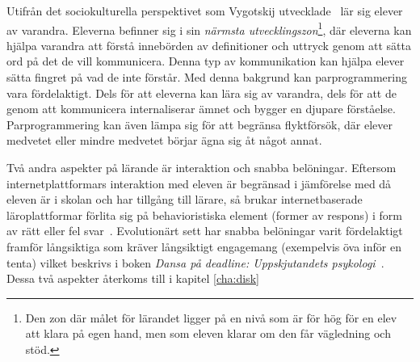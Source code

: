 Utifrån det sociokulturella perspektivet som Vygotskij utvecklade~\cite{LSB_und}
lär sig elever av varandra. Eleverna befinner sig i sin \textit{närmsta
utvecklingszon}\footnote{Den zon där målet för lärandet ligger på en nivå som är
för hög för en elev att klara på egen hand, men som eleven klarar om den får
vägledning och stöd.}, där eleverna kan hjälpa varandra att förstå innebörden av
definitioner och uttryck genom att sätta ord på det de vill kommunicera. Denna
typ av kommunikation kan hjälpa elever sätta fingret på vad de
inte förstår. Med denna bakgrund kan parprogrammering vara
fördelaktigt. Dels för att eleverna kan lära sig av varandra, dels för att de genom att
kommunicera
internaliserar ämnet och bygger en djupare
förståelse. Parprogrammering kan även lämpa sig för att begränsa
flyktförsök, där elever medvetet eller mindre medvetet börjar ägna sig åt något annat.


Två andra aspekter på lärande är interaktion och snabba
belöningar. Eftersom internetplattformars interaktion med eleven är
begränsad i jämförelse med då eleven är i skolan och har tillgång till
lärare, så brukar internetbaserade läroplattformar förlita sig på
behavioristiska element (former av respons) i form av rätt eller fel
svar~\cite{LSB_und}. Evolutionärt sett har snabba belöningar varit
fördelaktigt framför långsiktiga som kräver långsiktigt engagemang
(exempelvis öva inför en tenta) vilket beskrivs i boken \textit{Dansa
på deadline: Uppskjutandets psykologi}~\cite{DPD}. Dessa två aspekter återkoms till i kapitel \ref{cha:disk}
